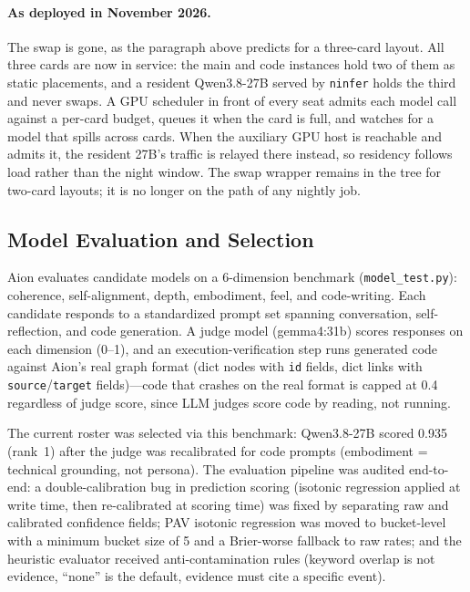 \documentclass[11pt,a4paper]{article}
\begin{document}
\paragraph{As deployed in November 2026.} The swap is gone, as the paragraph above predicts for a three-card layout. All three cards are now in service: the main and code instances hold two of them as static placements, and a resident Qwen3.8-27B served by \texttt{ninfer} holds the third and never swaps. A GPU scheduler in front of every seat admits each model call against a per-card budget, queues it when the card is full, and watches for a model that spills across cards. When the auxiliary GPU host is reachable and admits it, the resident 27B's traffic is relayed there instead, so residency follows load rather than the night window. The swap wrapper remains in the tree for two-card layouts; it is no longer on the path of any nightly job.

\subsection{Model Evaluation and Selection}

Aion evaluates candidate models on a 6-dimension benchmark (\texttt{model\_test.py}): coherence, self-alignment, depth, embodiment, feel, and code-writing. Each candidate responds to a standardized prompt set spanning conversation, self-reflection, and code generation. A judge model (gemma4:31b) scores responses on each dimension (0--1), and an execution-verification step runs generated code against Aion's real graph format (dict nodes with \texttt{id} fields, dict links with \texttt{source}/\texttt{target} fields)---code that crashes on the real format is capped at 0.4 regardless of judge score, since LLM judges score code by reading, not running.

The current roster was selected via this benchmark: Qwen3.8-27B scored 0.935 (rank~1) after the judge was recalibrated for code prompts (embodiment = technical grounding, not persona). The evaluation pipeline was audited end-to-end: a double-calibration bug in prediction scoring (isotonic regression applied at write time, then re-calibrated at scoring time) was fixed by separating raw and calibrated confidence fields; PAV isotonic regression was moved to bucket-level with a minimum bucket size of 5 and a Brier-worse fallback to raw rates; and the heuristic evaluator received anti-contamination rules (keyword overlap is not evidence, ``none'' is the default, evidence must cite a specific event).
\end{document}
